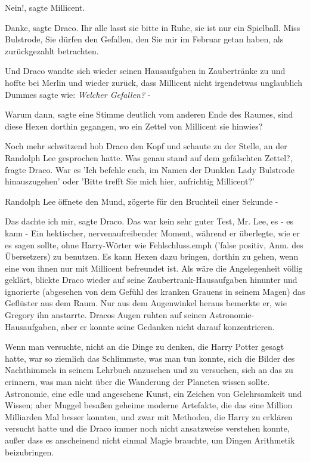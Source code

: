 \glqq Nein!\grqq{}, sagte Millicent.

\glqq Danke\grqq{}, sagte Draco. \glqq Ihr alle lasst sie bitte in Ruhe, sie ist
nur ein Spielball. Miss Bulstrode, Sie dürfen den Gefallen, den Sie mir im
Februar getan haben, als zurückgezahlt betrachten.\grqq{}

Und Draco wandte sich wieder seinen Hausaufgaben in Zaubertränke zu und hoffte
bei Merlin und wieder zurück, dass Millicent nicht irgendetwas unglaublich
Dummes sagte wie:\emph{ \glqq Welcher Gefallen?\grqq{} } -

\glqq Warum dann\grqq{}, sagte eine Stimme deutlich vom anderen Ende des Raumes,
\glqq sind diese Hexen dorthin gegangen, wo ein Zettel von Millicent sie
hinwies?\grqq{}

Noch mehr schwitzend hob Draco den Kopf und schaute zu der Stelle, an der
Randolph Lee gesprochen hatte. \glqq Was genau stand auf dem gefälschten
Zettel?\grqq{}, fragte Draco. \glqq War es 'Ich befehle euch, im Namen der
Dunklen Lady Bulstrode hinauszugehen' oder 'Bitte trefft Sie mich hier,
aufrichtig Millicent?'\grqq{}

Randolph Lee öffnete den Mund, zögerte für den Bruchteil einer Sekunde -

\glqq Das dachte ich mir\grqq{}, sagte Draco. \glqq Das war kein sehr guter
Test, Mr. Lee, es - es kann -\grqq{} Ein hektischer, nervenaufreibender Moment,
während er überlegte, wie er es sagen sollte, ohne Harry-Wörter wie \glqq
Fehlschluss\grqq{}.emph{ ('false positiv, Anm. des Übersetzers)} zu benutzen.
\glqq Es kann Hexen dazu bringen, dorthin zu gehen, wenn eine von ihnen nur mit
Millicent befreundet ist.\grqq{} Als wäre die Angelegenheit völlig geklärt,
blickte Draco wieder auf seine Zaubertrank-Hausaufgaben hinunter und ignorierte
(abgesehen von dem Gefühl des kranken Grauens in seinem Magen) das Geflüster aus
dem Raum. Nur aus dem Augenwinkel heraus bemerkte er, wie Gregory ihn anstarrte.
Dracos Augen ruhten auf seinen Astronomie-Hausaufgaben, aber er konnte seine
Gedanken nicht darauf konzentrieren.

Wenn man versuchte, nicht an die Dinge zu denken, die Harry Potter gesagt hatte,
war so ziemlich das Schlimmste, was man tun konnte, sich die Bilder des
Nachthimmels in seinem Lehrbuch anzusehen und zu versuchen, sich an das zu
erinnern, was man nicht über die Wanderung der Planeten wissen sollte.
Astronomie, eine edle und angesehene Kunst, ein Zeichen von Gelehrsamkeit und
Wissen; aber Muggel besaßen geheime moderne Artefakte, die das eine Million
Milliarden Mal besser konnten, und zwar mit Methoden, die Harry zu erklären
versucht hatte und die Draco immer noch nicht ansatzweise verstehen konnte,
außer dass es anscheinend nicht einmal Magie brauchte, um Dingen Arithmetik
beizubringen.

